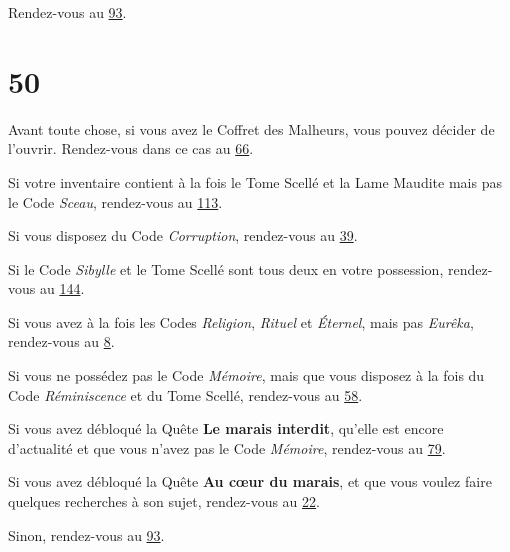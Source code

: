 \documentclass{report}
\newcommand{\gsection}[1]{
    \section{#1}
    \label{section-#1}
}
\newcommand{\glink}[1]{\hyperref[section-#1]{#1}}
\begin{document}
Rendez-vous au \glink{93}.

\gsection{50}

Avant toute chose, si vous avez le Coffret des Malheurs, vous pouvez décider de l'ouvrir. Rendez-vous dans ce cas au \glink{66}.

Si votre inventaire contient à la fois le Tome Scellé et la Lame Maudite mais pas le Code \emph{Sceau}, rendez-vous au \glink{113}.

Si vous disposez du Code \emph{Corruption}, rendez-vous au \glink{39}.

Si le Code \emph{Sibylle} et le Tome Scellé sont tous deux en votre possession, rendez-vous au \glink{144}.

Si vous avez à la fois les Codes \emph{Religion}, \emph{Rituel} et \emph{Éternel}, mais pas \emph{Eurêka}, rendez-vous au \glink{8}.

Si vous ne possédez pas le Code \emph{Mémoire}, mais que vous disposez à la fois du Code \emph{Réminiscence} et du Tome Scellé, rendez-vous au \glink{58}.

Si vous avez débloqué la Quête \textbf{Le marais interdit}, qu'elle est encore d'actualité et que vous n'avez pas le Code \emph{Mémoire}, rendez-vous au \glink{79}.

Si vous avez débloqué la Quête \textbf{Au cœur du marais}, et que vous voulez faire quelques recherches à son sujet, rendez-vous au \glink{22}.

Sinon, rendez-vous au \glink{93}.
\end{document}
